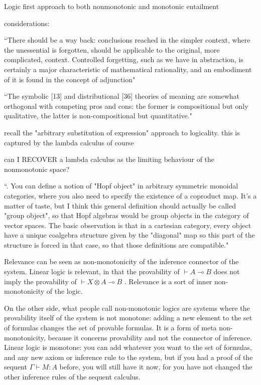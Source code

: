 \documentclass[a4paper,11pt]{report}
\begin{document}
Logic first approach to both nonmonotonic and monotonic entailment

considerations: 


``There should be a way back:
conclusions reached in the simpler context, where the unessential is
forgotten, should be applicable to the original, more complicated,
context. Controlled forgetting, such as we have in abstraction, is
certainly a major characteristic of mathematical rationality, and an
embodiment of it is found in the concept of adjunction"

``The symbolic [13] and distributional [36] theories of meaning are somewhat orthogonal with competing pros and cons: the former is compositional but only qualitative, the latter is non-compositional but quantitative."

recall the "arbitrary substitution of expression" approach to logicality. this is captured by the lambda calculus of course

can I RECOVER a lambda calculus as the limiting behaviour of the nonmonotonic space?

``. You can define a notion of "Hopf object" in arbitrary symmetric monoidal categories, where you also need to specify the existence of a coproduct map. It's a matter of taste, but I think this general definition should actually be called "group object", so that Hopf algebras would be group objects in the category of vector spaces. The basic observation is that in a cartesian category, every object have a unique coalgebra structure given by the "diagonal" map so this part of the structure is forced in that case, so that those definitions are compatible."

Relevance can be seen as non-monotonicity of the inference connector of the system. Linear logic is relevant, in that the provability of $\vdash A \multimap B $
 does not imply the provability of $\vdash X \otimes A \multimap B $
. Relevance is a sort of inner non-monotonicity of the logic.

On the other side, what people call non-monotonic logics are systems where the provability itself of the system is not monotone: adding a new element to the set of formulas changes the set of provable formulas. It is a form of meta non-monotonicity, because it concerns provability and not the connector of inference. Linear logic is monotone: you can add whatever you want to the set of formulas, and any new axiom or inference rule to the system, but if you had a proof of the sequent $\Gamma \vdash M : A $
 before, you will still have it now, for you have not changed the other inference rules of the sequent calculus.
\end{document}
